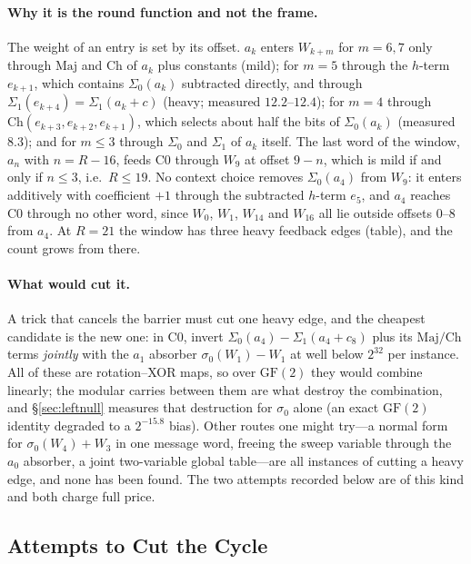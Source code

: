 \documentclass[11pt,a4paper]{article}
\newcommand{\Sig}[1]{\Sigma_{#1}}
\newcommand{\sig}[1]{\sigma_{#1}}
\newcommand{\Maj}{\mathrm{Maj}}
\newcommand{\Ch}{\mathrm{Ch}}
\begin{document}
\paragraph{Why it is the round function and not the frame.}
The weight of an entry is set by its offset.  $a_k$ enters $W_{k+m}$ for
$m=6,7$ only through $\Maj$ and $\Ch$ of $a_k$ plus constants (mild); for
$m=5$ through the $h$-term $e_{k+1}$, which contains $\Sig{0}(a_k)$ subtracted
directly, and through $\Sig{1}(e_{k+4})=\Sig{1}(a_k+c)$ (heavy; measured
$12.2$--$12.4$); for $m=4$ through $\Ch(e_{k+3},e_{k+2},e_{k+1})$, which
selects about half the bits of $\Sig{0}(a_k)$ (measured $8.3$); and for
$m\le3$ through $\Sig{0}$ and $\Sig{1}$ of $a_k$ itself.  The last word of
the window, $a_n$ with $n=R-16$, feeds C0 through $W_9$ at offset $9-n$, which
is mild if and only if $n\le3$, i.e.\ $R\le19$.  No context choice removes
$\Sig{0}(a_4)$ from $W_9$: it enters additively with coefficient $+1$
through the subtracted $h$-term $e_5$, and $a_4$ reaches C0 through no
other word, since $W_0$, $W_1$, $W_{14}$ and $W_{16}$ all lie outside
offsets $0$--$8$ from $a_4$.  At
$R{=}21$ the window has three heavy feedback edges (table), and the count
grows from there.

\paragraph{What would cut it.}
A trick that cancels the barrier must cut one heavy edge, and the cheapest
candidate is the new one: in C0, invert $\Sig{0}(a_4)-\Sig{1}(a_4+c_8)$ plus
its $\Maj/\Ch$ terms \emph{jointly} with the $a_1$ absorber $\sig{0}(W_1)-W_1$
at well below $2^{32}$ per instance.  All of these are rotation--XOR maps, so
over $\mathrm{GF}(2)$ they would combine linearly; the modular carries between
them are what destroy the combination, and \S\ref{sec:leftnull} measures that
destruction for $\sig{0}$ alone (an exact $\mathrm{GF}(2)$ identity degraded
to a $2^{-15.8}$ bias).  Other routes one might try---a normal form for
$\sig{0}(W_4)+W_3$ in one message word, freeing the sweep variable through
the $a_0$ absorber, a joint two-variable global table---are all instances
of cutting a heavy edge, and none has been found.
The two attempts recorded below are of this kind and both charge full price.

\subsection{Attempts to Cut the Cycle}
\label{sec:cut}
\end{document}
